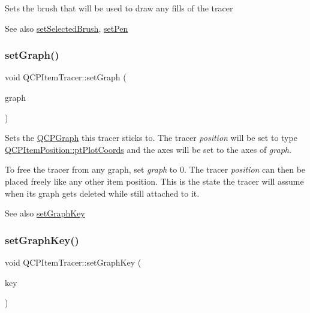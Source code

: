 Sets the brush that will be used to draw any fills of the tracer

\begin{DoxySeeAlso}{See also}
\mbox{\hyperlink{class_q_c_p_item_tracer_a0f55c084980a7a312af859d3e7b558ef}{set\+Selected\+Brush}}, \mbox{\hyperlink{class_q_c_p_item_tracer_af8048636fc1ef0152e51809b008df2ca}{set\+Pen}} 
\end{DoxySeeAlso}
\mbox{\label{class_q_c_p_item_tracer_af5886f4ded8dd68cb4f3388f390790c0}} 
\subsubsection{\texorpdfstring{setGraph()}{setGraph()}}
{\footnotesize\ttfamily void Q\+C\+P\+Item\+Tracer\+::set\+Graph (\begin{DoxyParamCaption}\item[{\mbox{\hyperlink{class_q_c_p_graph}{Q\+C\+P\+Graph}} $\ast$}]{graph }\end{DoxyParamCaption})}

Sets the \mbox{\hyperlink{class_q_c_p_graph}{Q\+C\+P\+Graph}} this tracer sticks to. The tracer {\itshape position} will be set to type \mbox{\hyperlink{class_q_c_p_item_position_aad9936c22bf43e3d358552f6e86dbdc8ad5ffb8dc99ad73263f7010c77342294c}{Q\+C\+P\+Item\+Position\+::pt\+Plot\+Coords}} and the axes will be set to the axes of {\itshape graph}.

To free the tracer from any graph, set {\itshape graph} to 0. The tracer {\itshape position} can then be placed freely like any other item position. This is the state the tracer will assume when its graph gets deleted while still attached to it.

\begin{DoxySeeAlso}{See also}
\mbox{\hyperlink{class_q_c_p_item_tracer_a6840143b42f3b685cedf7c6d83a704c8}{set\+Graph\+Key}} 
\end{DoxySeeAlso}
\mbox{\label{class_q_c_p_item_tracer_a6840143b42f3b685cedf7c6d83a704c8}} 
\subsubsection{\texorpdfstring{setGraphKey()}{setGraphKey()}}
{\footnotesize\ttfamily void Q\+C\+P\+Item\+Tracer\+::set\+Graph\+Key (\begin{DoxyParamCaption}\item[{double}]{key }\end{DoxyParamCaption})}

